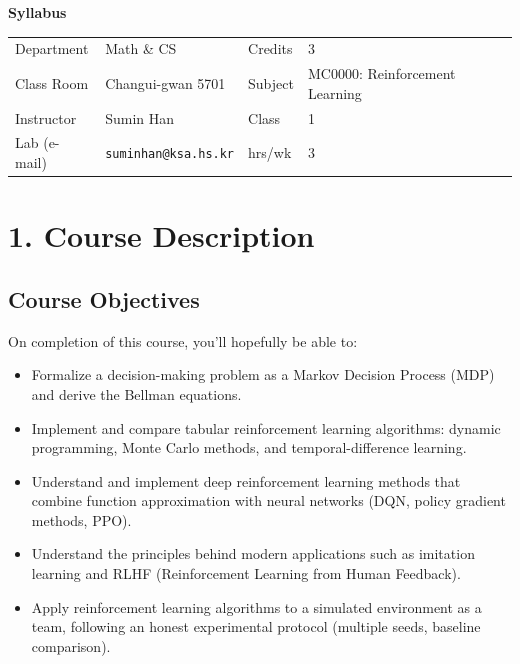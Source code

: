 \documentclass[11pt]{article}
\begin{document}
\begin{center}
{\LARGE \bf Syllabus}
\end{center}

\vspace{4pt}
\noindent
\begin{tabular}{@{}p{2.3cm}p{4.3cm}p{1.7cm}p{5.0cm}@{}}
\toprule
Department & Math \& CS & Credits & 3 \\
Class Room & Changui-gwan 5701 & Subject & MC0000: Reinforcement
Learning \\
Instructor & Sumin Han & Class & 1 \\
Lab (e-mail) & \texttt{suminhan@ksa.hs.kr} & hrs/wk & 3 \\
\bottomrule
\end{tabular}

\section*{1. Course Description}

\subsection*{Course Objectives}
On completion of this course, you'll hopefully be able to:
\begin{itemize}[nosep]
\item Formalize a decision-making problem as a Markov Decision Process
  (MDP) and derive the Bellman equations.
\item Implement and compare tabular reinforcement learning algorithms:
  dynamic programming, Monte Carlo methods, and temporal-difference
  learning.
\item Understand and implement deep reinforcement learning methods that
  combine function approximation with neural networks (DQN, policy
  gradient methods, PPO).
\item Understand the principles behind modern applications such as
  imitation learning and RLHF (Reinforcement Learning from Human
  Feedback).
\item Apply reinforcement learning algorithms to a simulated environment
  as a team, following an honest experimental protocol (multiple seeds,
  baseline comparison).
\end{itemize}
\end{document}
